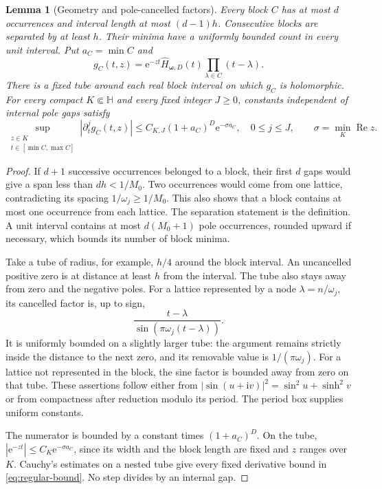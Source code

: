 \documentclass[11pt,a4paper]{article}
\numberwithin{equation}{section}
\newtheorem{lemma}[theorem]{Lemma}
\theoremstyle{definition}
\theoremstyle{remark}
\newcommand{\e}{\mathrm e}
\newcommand{\ii}{\mathrm i}
\newcommand{\re}{\operatorname{Re}}
\newcommand{\Hh}{\mathbb H}
\begin{document}
\begin{lemma}[Geometry and pole-cancelled factors]
\label{lem:block-geometry}
Every block $C$ has at most $d$ occurrences and interval length at most
$(d-1)h$. Consecutive blocks are separated by at least $h$. Their minima
have a uniformly bounded count in every unit interval. Put $a_C=\min C$
and
\begin{equation}
 g_C(t,z)=\e^{-zt}\widehat H_{\boldsymbol\omega,D}(t)
                         \prod_{\lambda\in C}(t-\lambda).
 \label{eq:regular-factor}
\end{equation}
There is a fixed tube around each real block interval on which $g_C$ is
holomorphic. For every compact $K\Subset\Hh$ and every fixed integer
$J\ge0$, constants independent of internal pole gaps satisfy
\begin{equation}
 \sup_{\substack{z\in K\\t\in[\min C,\max C]}}
       |\partial_t^j g_C(t,z)|
 \le C_{K,J}(1+a_C)^D\e^{-\sigma a_C},
 \quad 0\le j\le J,\qquad \sigma=\min_K\re z.
 \label{eq:regular-bound}
\end{equation}
\end{lemma}
\begin{proof}
If $d+1$ successive occurrences belonged to a block, their first $d$
gaps would give a span less than $dh<1/M_0$. Two occurrences would come
from one lattice, contradicting its spacing $1/\omega_j\ge1/M_0$.
This also shows that a block contains at most one occurrence from each
lattice. The separation statement is the definition. A unit interval
contains at most $d(M_0+1)$ pole occurrences, rounded upward if necessary,
which bounds its number of block minima.

Take a tube of radius, for example, $h/4$ around the block interval.
An uncancelled positive zero is at distance at least $h$ from the
interval. The tube also stays away from zero and the negative poles.
For a lattice represented by a node $\lambda=n/\omega_j$, its cancelled
factor is, up to sign,
\[
 \frac{t-\lambda}{\sin(\pi\omega_j(t-\lambda))}.
\]
It is uniformly bounded on a slightly larger tube: the argument remains
strictly inside the distance to the next zero, and its removable value
is $1/(\pi\omega_j)$. For a lattice not represented in the block, the
sine factor is bounded away from zero on that tube. These assertions
follow either from $|\sin(u+\ii v)|^2=\sin^2u+\sinh^2v$ or from
compactness after reduction modulo its period. The period box supplies
uniform constants.

The numerator is bounded by a constant times $(1+a_C)^D$. On the tube,
$|\e^{-zt}|\le C_K\e^{-\sigma a_C}$, since its width and the block
length are fixed and $z$ ranges over $K$. Cauchy's estimates on a nested
tube give every fixed derivative bound in \eqref{eq:regular-bound}.
No step divides by an internal gap.
\end{proof}
\end{document}
